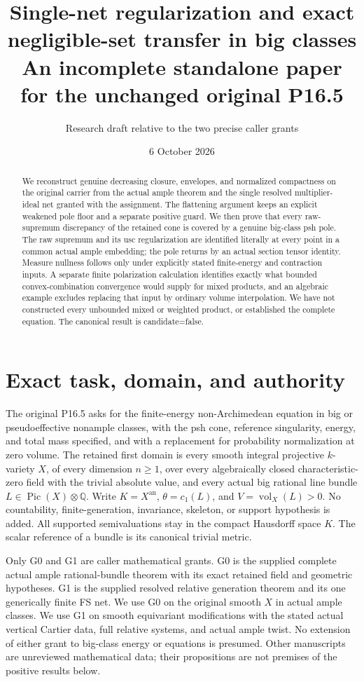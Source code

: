 \documentclass[10pt]{article}
\title{Single-net regularization and exact negligible-set transfer in big classes\\
\large An incomplete standalone paper for the unchanged original P16.5}
\author{Research draft relative to the two precise caller grants}
\date{6 October 2026}
\newcommand{\vol}{\operatorname{vol}}
\newcommand{\an}{\mathrm{an}}
\begin{document}
\maketitle
\begin{abstract}
We reconstruct genuine decreasing closure, envelopes, and normalized
compactness on the original carrier from the actual ample theorem and the
single resolved multiplier-ideal net granted with the assignment. The
flattening argument keeps an explicit weakened pole floor and a separate
positive guard. We then prove that every raw-supremum discrepancy of the
retained cone is covered by a genuine big-class psh pole. The raw supremum
and its usc regularization are identified literally at every point in a
common actual ample embedding; the pole returns by an actual section
tensor identity. Measure nullness follows only under explicitly stated
finite-energy and contraction inputs. A separate finite polarization
calculation identifies exactly what bounded convex-combination convergence
would supply for mixed products, and an algebraic example excludes replacing
that input by ordinary volume interpolation. We have not constructed every
unbounded mixed or weighted product, or established the complete equation.
The canonical result is candidate=false.
\end{abstract}

\section{Exact task, domain, and authority}
The original P16.5 asks for the finite-energy non-Archimedean equation
in big or pseudoeffective nonample classes, with the psh cone, reference
singularity, energy, and total mass specified, and with a replacement for
probability normalization at zero volume. The retained first domain is
every smooth integral projective $k$-variety $X$, of every dimension
$n\geq1$, over every algebraically closed characteristic-zero field
with the trivial absolute value, and every actual big rational line bundle
$L\in\operatorname{Pic}(X)\otimes\mathbb Q$. Write
$K=X^\an$, $\theta=c_1(L)$, and $V=\vol_X(L)>0$. No countability,
finite-generation, invariance, skeleton, or support hypothesis is added.
All supported semivaluations stay in the compact Hausdorff space $K$.
The scalar reference of a bundle is its canonical trivial metric.

Only G0 and G1 are caller mathematical grants. G0 is the supplied
complete actual ample rational-bundle theorem with its exact retained
field and geometric hypotheses. G1 is the supplied resolved relative
generation theorem and its one generically finite FS net. We use G0 on
the original smooth $X$ in actual ample classes. We use G1 on smooth
equivariant modifications with the stated actual vertical Cartier data,
full relative systems, and actual ample twist. No extension of either
grant to big-class energy or equations is presumed. Other manuscripts
are unreviewed mathematical data; their propositions are not premises
of the positive results below.
\end{document}
